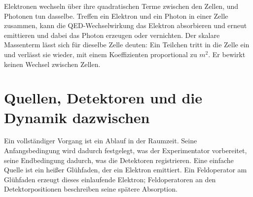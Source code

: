 \begin{classroomqa}
\end{classroomqa}

Elektronen wechseln über ihre quadratischen Terme zwischen den Zellen, und Photonen tun dasselbe. Treffen ein Elektron und ein Photon in einer Zelle zusammen, kann die QED-Wechselwirkung das Elektron absorbieren und erneut emittieren und dabei das Photon erzeugen oder vernichten. Der skalare Massenterm lässt sich für dieselbe Zelle deuten: Ein Teilchen tritt in die Zelle ein und verlässt sie wieder, mit einem Koeffizienten proportional zu \(m^2\). Er bewirkt keinen Wechsel zwischen Zellen.

\begin{classroomqa}
\end{classroomqa}

\begin{classroomqa}
\end{classroomqa}

\section{Quellen, Detektoren und die Dynamik dazwischen}

Ein vollständiger Vorgang ist ein Ablauf in der Raumzeit. Seine Anfangsbedingung wird dadurch festgelegt, was der Experimentator vorbereitet, seine Endbedingung dadurch, was die Detektoren registrieren. Eine einfache Quelle ist ein heißer Glühfaden, der ein Elektron emittiert. Ein Feldoperator am Glühfaden erzeugt dieses einlaufende Elektron; Feldoperatoren an den Detektorpositionen beschreiben seine spätere Absorption.

